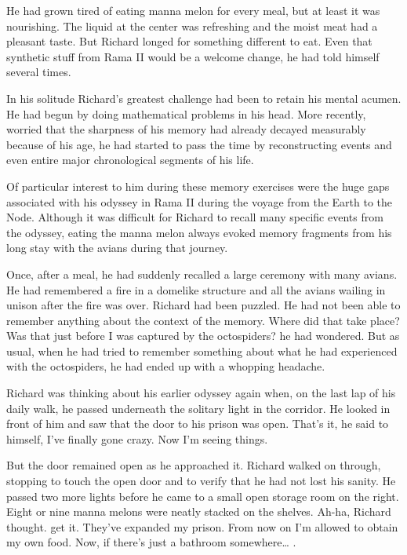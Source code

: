 \documentclass[]{article}
\begin{document}
{He had grown tired of eating manna melon for every meal, but at least it was nourishing.  The liquid at the center was refreshing and the moist meat had a pleasant taste.  But Richard longed for something different to eat.  Even that synthetic stuff from Rama II would be a welcome change, he had told himself several times.

In his solitude Richard’s greatest challenge had been to retain his mental acumen.  He had begun by doing mathematical problems in his head.  More recently, worried that the sharpness of his memory had already decayed measurably because of his age, he had started to pass the time by reconstructing events and even entire major chronological segments of his life.

Of particular interest to him during these memory exercises were the huge gaps associated with his odyssey in Rama II during the voyage from the Earth to the Node.  Although it was difficult for Richard to recall many specific events from the odyssey, eating the manna melon always evoked memory fragments from his long stay with the avians during that journey.

Once, after a meal, he had suddenly recalled a large ceremony with many avians.  He had remembered a fire in a domelike structure and all the avians wailing in unison after the fire was over.  Richard had been puzzled.  He had not been able to remember anything about the context of the memory.  Where did that take place? Was that just before I was captured by the octospiders? he had wondered.  But as usual, when he had tried to remember something about what he had experienced with the octospiders, he had ended up with a whopping headache.

Richard was thinking about his earlier odyssey again when, on the last lap of his daily walk, he passed underneath the solitary light in the corridor.  He looked in front of him and saw that the door to his prison was open.  That’s it, he said to himself, I’ve finally gone crazy.  Now I’m seeing things.

But the door remained open as he approached it.  Richard walked on through, stopping to touch the open door and to verify that he had not lost his sanity.  He passed two more lights before he came to a small open storage room on the right.  Eight or nine manna melons were neatly stacked on the shelves.  Ah-ha, Richard thought.  get it.  They’ve expanded my prison.  From now on I’m allowed to obtain my own food.  Now, if there’s just a bathroom somewhere… .

}
\end{document}
